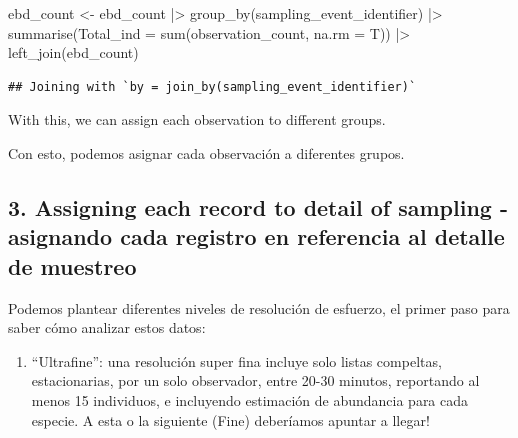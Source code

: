 \documentclass[
]{article}
\newenvironment{Shaded}{\begin{snugshade}}{\end{snugshade}}
\newcommand{\AttributeTok}[1]{\textcolor[rgb]{0.77,0.63,0.00}{#1}}
\newcommand{\FunctionTok}[1]{\textcolor[rgb]{0.00,0.00,0.00}{#1}}
\newcommand{\NormalTok}[1]{#1}
\newcommand{\OtherTok}[1]{\textcolor[rgb]{0.56,0.35,0.01}{#1}}
\newcommand{\SpecialCharTok}[1]{\textcolor[rgb]{0.00,0.00,0.00}{#1}}
\providecommand{\tightlist}{%
  \setlength{\itemsep}{0pt}\setlength{\parskip}{0pt}}
\begin{document}
\begin{Shaded}
\begin{Highlighting}[]
\NormalTok{ebd\_count }\OtherTok{\textless{}{-}}\NormalTok{ ebd\_count }\SpecialCharTok{|\textgreater{}}
  \FunctionTok{group\_by}\NormalTok{(sampling\_event\_identifier) }\SpecialCharTok{|\textgreater{}}
  \FunctionTok{summarise}\NormalTok{(}\AttributeTok{Total\_ind =} \FunctionTok{sum}\NormalTok{(observation\_count, }\AttributeTok{na.rm =}\NormalTok{ T)) }\SpecialCharTok{|\textgreater{}}
  \FunctionTok{left\_join}\NormalTok{(ebd\_count)}
\end{Highlighting}
\end{Shaded}

\begin{verbatim}
## Joining with `by = join_by(sampling_event_identifier)`
\end{verbatim}

With this, we can assign each observation to different groups.

Con esto, podemos asignar cada observación a diferentes grupos.

\hypertarget{assigning-each-record-to-detail-of-sampling---asignando-cada-registro-en-referencia-al-detalle-de-muestreo}{%
\subsection{3. Assigning each record to detail of sampling - asignando
cada registro en referencia al detalle de
muestreo}\label{assigning-each-record-to-detail-of-sampling---asignando-cada-registro-en-referencia-al-detalle-de-muestreo}}

Podemos plantear diferentes niveles de resolución de esfuerzo, el primer
paso para saber cómo analizar estos datos:

\begin{enumerate}
\def\labelenumi{\arabic{enumi}.}
\tightlist
\item
  ``Ultrafine'': una resolución super fina incluye solo listas
  compeltas, estacionarias, por un solo observador, entre 20-30 minutos,
  reportando al menos 15 individuos, e incluyendo estimación de
  abundancia para cada especie. A esta o la siguiente (Fine) deberíamos
  apuntar a llegar!
\end{enumerate}
\end{document}
